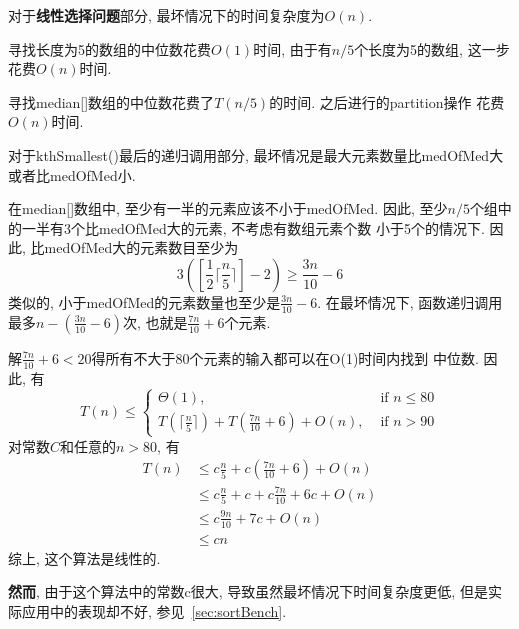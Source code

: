 对于\textbf{线性选择问题}部分, 最坏情况下的时间复杂度为$O(n)$.\par
寻找长度为5的数组的中位数花费$O(1)$时间, 由于有$n/5$个长度为5的数组,
这一步花费$O(n)$时间.\par
寻找median[]数组的中位数花费了$T(n/5)$的时间. 之后进行的partition操作
花费$O(n)$时间.\par
对于kthSmallest()最后的递归调用部分, 最坏情况是最大元素数量比medOfMed大
或者比medOfMed小.\par
在median[]数组中, 至少有一半的元素应该不小于medOfMed.
因此, 至少$n/5$个组中的一半有3个比medOfMed大的元素, 不考虑有数组元素个数
小于5个的情况下. 因此, 比medOfMed大的元素数目至少为
\begin{equation}
	3([\frac{1}{2}\lceil\frac{n}{5}\rceil]-2)\geq\frac{3n}{10}-6
	\label{eq:kthSmallest1}
\end{equation}
类似的, 小于medOfMed的元素数量也至少是$\frac{3n}{10}-6$. 在最坏情况下,
函数递归调用最多$n-(\frac{3n}{10}-6)$次, 也就是$\frac{7n}{10}+6$个元素.\par
解$\frac{7n}{10}+6<20$得所有不大于80个元素的输入都可以在O(1)时间内找到
中位数. 因此, 有
\begin{equation}
	T(n) \leq
	\begin{cases}
		\Theta(1),                                          & \text{ if }n \leq 80 \\
		T(\lceil\frac{n}{5}\rceil)+T(\frac{7n}{10}+6)+O(n), & \text{ if }n > 90
	\end{cases}
	\label{eq:kthSmallest2}
\end{equation}
对常数$C$和任意的$n>80$, 有
\begin{align}
	T(n) & \leq c\frac{n}{5}+c(\frac{7n}{10}+6)+O(n)  \nonumber \\
	     & \leq c\frac{n}{5}+c+c\frac{7n}{10}+6c+O(n) \nonumber \\
	     & \leq c\frac{9n}{10}+7c+O(n)                \nonumber \\
	     & \leq cn \nonumber
	\label{eq:kthSmallest3}
\end{align}
综上, 这个算法是线性的.\par
\textbf{然而}, 由于这个算法中的常数c很大, 导致虽然最坏情况下时间复杂度更低,
但是实际应用中的表现却不好, 参见~\ref{sec:sortBench}.\par
